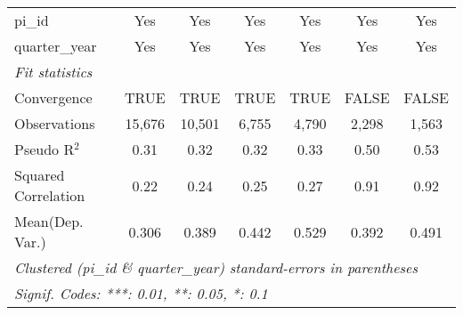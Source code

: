 \begin{tabular}{lcccccc}
   pi\_id                                                     & Yes          & Yes           & Yes           & Yes           & Yes           & Yes\\  
   quarter\_year                                              & Yes          & Yes           & Yes           & Yes           & Yes           & Yes\\  
   \midrule
   \emph{Fit statistics}\\
   Convergence                                                &TRUE          & TRUE          & TRUE          & TRUE          & FALSE         & FALSE\\  
   Observations                                               & 15,676       & 10,501        & 6,755         & 4,790         & 2,298         & 1,563\\  
   Pseudo R$^2$                                               & 0.31         & 0.32          & 0.32          & 0.33          & 0.50          & 0.53\\  
   Squared Correlation                                        & 0.22         & 0.24          & 0.25          & 0.27          & 0.91          & 0.92\\  
Mean(Dep. Var.) & 0.306 & 0.389 & 0.442 & 0.529 & 0.392 & 0.491 \\
   \midrule \midrule
   \multicolumn{7}{l}{\emph{Clustered (pi\_id \& quarter\_year) standard-errors in parentheses}}\\
   \multicolumn{7}{l}{\emph{Signif. Codes: ***: 0.01, **: 0.05, *: 0.1}}\\
\end{tabular}
\par\endgroup
